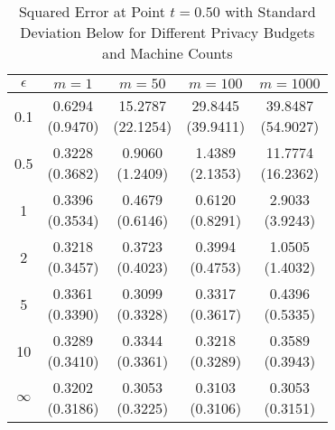 \begin{table}[ht]
\centering
\begin{tabular}{ccccc}
  \toprule
$\epsilon$ & $m=1$ & $m=50$ & $m=100$ & $m=1000$ \\ 
  \midrule
0.1 & \makecell{0.6294 \\ (0.9470)} & \makecell{15.2787 \\ (22.1254)} & \makecell{29.8445 \\ (39.9411)} & \makecell{39.8487 \\ (54.9027)} \\ 
  0.5 & \makecell{0.3228 \\ (0.3682)} & \makecell{0.9060 \\ (1.2409)} & \makecell{1.4389 \\ (2.1353)} & \makecell{11.7774 \\ (16.2362)} \\ 
  1 & \makecell{0.3396 \\ (0.3534)} & \makecell{0.4679 \\ (0.6146)} & \makecell{0.6120 \\ (0.8291)} & \makecell{2.9033 \\ (3.9243)} \\ 
  2 & \makecell{0.3218 \\ (0.3457)} & \makecell{0.3723 \\ (0.4023)} & \makecell{0.3994 \\ (0.4753)} & \makecell{1.0505 \\ (1.4032)} \\ 
  5 & \makecell{0.3361 \\ (0.3390)} & \makecell{0.3099 \\ (0.3328)} & \makecell{0.3317 \\ (0.3617)} & \makecell{0.4396 \\ (0.5335)} \\ 
  10 & \makecell{0.3289 \\ (0.3410)} & \makecell{0.3344 \\ (0.3361)} & \makecell{0.3218 \\ (0.3289)} & \makecell{0.3589 \\ (0.3943)} \\ 
  $\infty$ & \makecell{0.3202 \\ (0.3186)} & \makecell{0.3053 \\ (0.3225)} & \makecell{0.3103 \\ (0.3106)} & \makecell{0.3053 \\ (0.3151)} \\ 
   \bottomrule
\end{tabular}
\caption{Squared Error at Point $t=0.50$ with Standard Deviation Below for Different Privacy Budgets and Machine Counts} 
\label{tab:mse_point}
\end{table}
